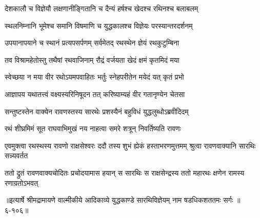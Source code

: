 \twolineshloka
{देशकालौ च विज्ञेयौ लक्षणानीङ्गितानि च}
{दैन्यं हर्षश्च खेदश्च रथिनश्च बलाबलम्} %

\twolineshloka
{स्थलनिम्नानि भूमेश्च समानि विषमाणि च}
{युद्धकालश्च विज्ञेयः परस्यान्तरदर्शनम्} %

\twolineshloka
{उपयानापयाने च स्थानं प्रत्यपसर्पणम्}
{सर्वमेतद् रथस्थेन ज्ञेयं रथकुटुम्बिना} %

\twolineshloka
{तव विश्रामहेतोस्तु तथैषां रथवाजिनाम्}
{रौद्रं वर्जयता खेदं क्षमं कृतमिदं मया} %

\twolineshloka
{स्वेच्छया न मया वीर रथोऽयमपवाहितः}
{भर्तुः स्नेहपरीतेन मयेदं यत् कृतं प्रभो} %

\twolineshloka
{आज्ञापय यथातत्त्वं वक्ष्यस्यरिनिषूदन}
{तत् करिष्याम्यहं वीर गतानृण्येन चेतसा} %

\twolineshloka
{सन्तुष्टस्तेन वाक्येन रावणस्तस्य सारथेः}
{प्रशस्यैनं बहुविधं युद्धलुब्धोऽब्रवीदिदम्} %

\twolineshloka
{रथं शीघ्रमिमं सूत राघवाभिमुखं नय}
{नाहत्वा समरे शत्रून् निवर्तिष्यति रावणः} %

\threelineshloka
{एवमुक्त्वा रथस्थस्य रावणो राक्षसेश्वरः}
{ददौ तस्य शुभं ह्येकं हस्ताभरणमुत्तमम्}
{श्रुत्वा रावणवाक्यानि सारथिः सन्न्यवर्तत} %

\twolineshloka
{ततो द्रुतं रावणवाक्यचोदितः प्रचोदयामास हयान् स सारथिः}
{स राक्षसेन्द्रस्य ततो महारथः क्षणेन रामस्य रणाग्रतोऽभवत्} %


॥इत्यार्षे श्रीमद्रामायणे वाल्मीकीये आदिकाव्ये युद्धकाण्डे सारथिविज्ञेयम् नाम षडधिकशततमः सर्गः ॥६-१०६॥
